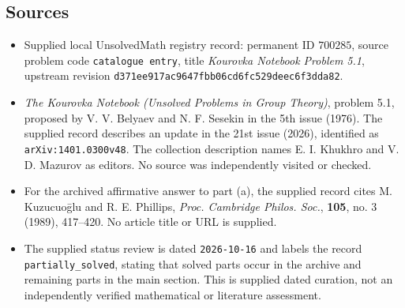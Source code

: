 \documentclass[11pt]{article}
\begin{document}
\subsection{Sources}
\begin{itemize}
\item Supplied local UnsolvedMath registry record: permanent ID \(700285\), source problem code \texttt{catalogue entry}, title \emph{Kourovka Notebook Problem 5.1}, upstream revision \texttt{d371ee917ac9647fbb06cd6fc529deec6f3dda82}.
\item \emph{The Kourovka Notebook (Unsolved Problems in Group Theory)}, problem 5.1, proposed by V. V. Belyaev and N. F. Sesekin in the 5th issue (1976). The supplied record describes an update in the 21st issue (2026), identified as \texttt{arXiv:1401.0300v48}. The collection description names E. I. Khukhro and V. D. Mazurov as editors. No source was independently visited or checked.
\item For the archived affirmative answer to part (a), the supplied record cites M. Kuzucuo\=glu and R. E. Phillips, \emph{Proc. Cambridge Philos. Soc.}, \textbf{105}, no. 3 (1989), 417--420. No article title or URL is supplied.
\item The supplied status review is dated \texttt{2026-10-16} and labels the record \texttt{partially\_solved}, stating that solved parts occur in the archive and remaining parts in the main section. This is supplied dated curation, not an independently verified mathematical or literature assessment.
\end{itemize}
\end{document}

